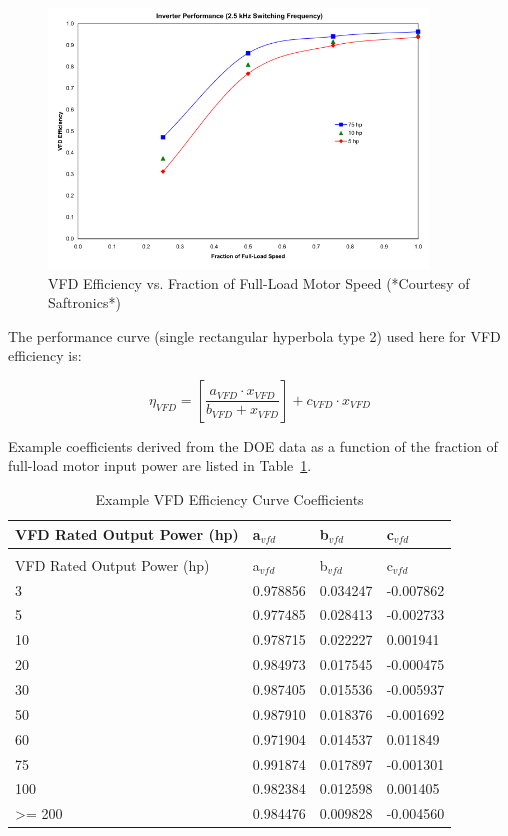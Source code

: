 {{{\begin{figure}[hbtp] %
\centering
\includegraphics[width=0.9\textwidth, height=0.9\textheight, keepaspectratio=true]{media/image4924.svg.png}
\caption{VFD Efficiency vs. Fraction of Full-Load Motor Speed (*Courtesy of Saftronics*) \protect \label{fig:vfd-efficiency-vs.-fraction-of-full-load}}
\end{figure}

The performance curve (single rectangular hyperbola type 2) used here for VFD efficiency is:

\begin{equation}
{\eta_{VFD}} = \left[ {\frac{{{a_{VFD}} \cdot {x_{VFD}}}}{{{b_{VFD}} + {x_{VFD}}}}} \right] + {c_{VFD}} \cdot {x_{VFD}}
\end{equation}

Example coefficients derived from the DOE data as a function of the fraction of full-load motor input power are listed in Table~\ref{table:example-vfd-efficiency-curve-coefficients}.

\begin{longtable}[c]{@{}llll@{}}
\caption{Example VFD Efficiency Curve Coefficients \label{table:example-vfd-efficiency-curve-coefficients}} \tabularnewline
\toprule 
VFD Rated Output Power (hp) & a\(_{vfd}\) & b\(_{vfd}\) & c\(_{vfd}\) \tabularnewline \midrule
\midrule
\endfirsthead

\caption[]{Example VFD Efficiency Curve Coefficients} \tabularnewline
\toprule 
VFD Rated Output Power (hp) & a\(_{vfd}\) & b\(_{vfd}\) & c\(_{vfd}\) \tabularnewline \midrule
\midrule
\endhead

3 & 0.978856 & 0.034247 & -0.007862 \tabularnewline
5 & 0.977485 & 0.028413 & -0.002733 \tabularnewline
10 & 0.978715 & 0.022227 & 0.001941 \tabularnewline
20 & 0.984973 & 0.017545 & -0.000475 \tabularnewline
30 & 0.987405 & 0.015536 & -0.005937 \tabularnewline
50 & 0.987910 & 0.018376 & -0.001692 \tabularnewline
60 & 0.971904 & 0.014537 & 0.011849 \tabularnewline
75 & 0.991874 & 0.017897 & -0.001301 \tabularnewline
100 & 0.982384 & 0.012598 & 0.001405 \tabularnewline
>= 200 & 0.984476 & 0.009828 & -0.004560 \tabularnewline
\bottomrule
\end{longtable}

}}}
